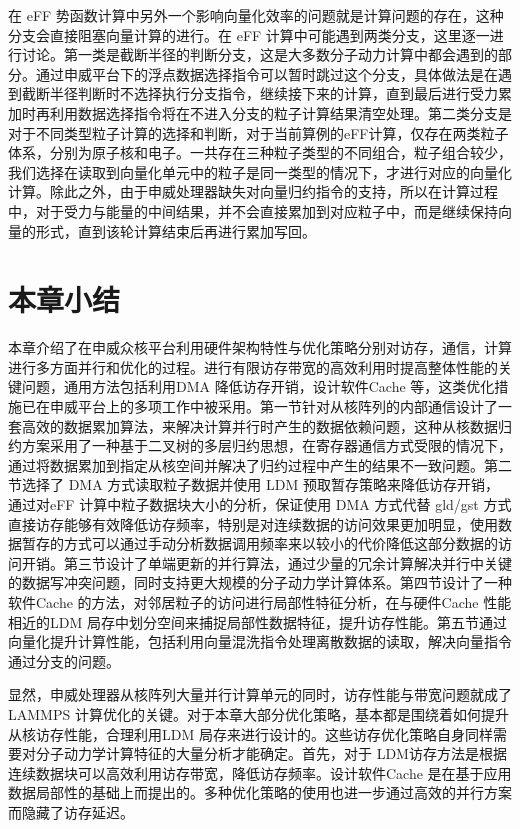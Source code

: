 在 eFF 势函数计算中另外一个影响向量化效率的问题就是计算问题的存在，这种分支会直接阻塞向量计算的进行。在 eFF 计算中可能遇到两类分支，这里逐一进行讨论。第一类是截断半径的判断分支，这是大多数分子动力计算中都会遇到的部分。通过申威平台下的浮点数据选择指令可以暂时跳过这个分支，具体做法是在遇到截断半径判断时不选择执行分支指令，继续接下来的计算，直到最后进行受力累加时再利用数据选择指令将在不进入分支的粒子计算结果清空处理。第二类分支是对于不同类型粒子计算的选择和判断，对于当前算例的eFF计算，仅存在两类粒子体系，分别为原子核和电子。一共存在三种粒子类型的不同组合，粒子组合较少，我们选择在读取到向量化单元中的粒子是同一类型的情况下，才进行对应的向量化计算。除此之外，由于申威处理器缺失对向量归约指令的支持，所以在计算过程中，对于受力与能量的中间结果，并不会直接累加到对应粒子中，而是继续保持向量的形式，直到该轮计算结束后再进行累加写回。


\section{本章小结}
本章介绍了在申威众核平台利用硬件架构特性与优化策略分别对访存，通信，计算进行多方面并行和优化的过程。进行有限访存带宽的高效利用时提高整体性能的关键问题，通用方法包括利用DMA 降低访存开销，设计软件Cache 等，这类优化措施已在申威平台上的多项工作中被采用\cite{dong2016implementing,duan2018redesigning,meng2016hybrid}。第一节针对从核阵列的内部通信设计了一套高效的数据累加算法，来解决计算并行时产生的数据依赖问题，这种从核数据归约方案采用了一种基于二叉树的多层归约思想，在寄存器通信方式受限的情况下，通过将数据累加到指定从核空间并解决了归约过程中产生的结果不一致问题。第二节选择了 DMA 方式读取粒子数据并使用 LDM 预取暂存策略来降低访存开销，通过对eFF 计算中粒子数据块大小的分析，保证使用 DMA 方式代替 gld/gst 方式直接访存能够有效降低访存频率，特别是对连续数据的访问效果更加明显，使用数据暂存的方式可以通过手动分析数据调用频率来以较小的代价降低这部分数据的访问开销。第三节设计了单端更新的并行算法，通过少量的冗余计算解决并行中关键的数据写冲突问题，同时支持更大规模的分子动力学计算体系。第四节设计了一种软件Cache 的方法，对邻居粒子的访问进行局部性特征分析，在与硬件Cache 性能相近的LDM 局存中划分空间来捕捉局部性数据特征，提升访存性能。第五节通过向量化提升计算性能，包括利用向量混洗指令处理离散数据的读取，解决向量指令通过分支的问题。

显然，申威处理器从核阵列大量并行计算单元的同时，访存性能与带宽问题就成了LAMMPS 计算优化的关键。对于本章大部分优化策略，基本都是围绕着如何提升从核访存性能，合理利用LDM 局存来进行设计的。这些访存优化策略自身同样需要对分子动力学计算特征的大量分析才能确定。首先，对于 LDM访存方法是根据连续数据块可以高效利用访存带宽，降低访存频率。设计软件Cache 是在基于应用数据局部性的基础上而提出的。多种优化策略的使用也进一步通过高效的并行方案而隐藏了访存延迟。
